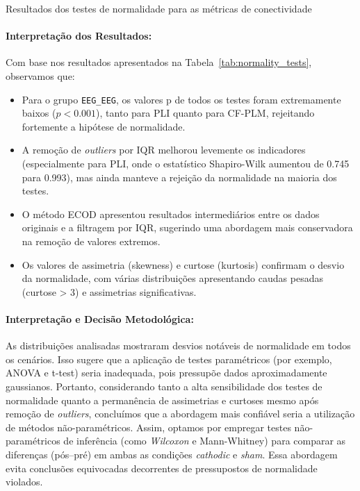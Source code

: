 \begin{table}[htbp]
    \caption{Resultados dos testes de normalidade para as métricas de conectividade}
    \label{tab:normality_tests}
    \begin{adjustbox}{width=\textwidth, center}
      
    \end{adjustbox}
  \end{table}
  

\paragraph{Interpretação dos Resultados:}
Com base nos resultados apresentados na Tabela~\ref{tab:normality_tests}, observamos que:

\begin{itemize}
    \item Para o grupo \texttt{EEG\_EEG}, os valores p de todos os testes foram extremamente baixos ($p < 0.001$), tanto para PLI quanto para CF-PLM, rejeitando fortemente a hipótese de normalidade.
    
    \item A remoção de \textit{outliers} por IQR melhorou levemente os indicadores (especialmente para PLI, onde o estatístico Shapiro-Wilk aumentou de 0.745 para 0.993), mas ainda manteve a rejeição da normalidade na maioria dos testes.
    
    \item O método ECOD apresentou resultados intermediários entre os dados originais e a filtragem por IQR, sugerindo uma abordagem mais conservadora na remoção de valores extremos.
    
    \item Os valores de assimetria (skewness) e curtose (kurtosis) confirmam o desvio da normalidade, com várias distribuições apresentando caudas pesadas (curtose > 3) e assimetrias significativas.
\end{itemize}

\paragraph{Interpretação e Decisão Metodológica:}
As distribuições analisadas mostraram desvios notáveis de normalidade em todos os cenários. Isso sugere que a aplicação de testes paramétricos (por exemplo, ANOVA e t-test) seria inadequada, pois pressupõe dados aproximadamente gaussianos. 
Portanto, considerando tanto a alta sensibilidade dos testes de normalidade quanto a permanência de assimetrias e curtoses mesmo após remoção de \textit{outliers}, concluímos que a abordagem mais confiável seria a utilização de métodos não-paramétricos.
Assim, optamos por empregar testes não-paramétricos de inferência (como \textit{Wilcoxon} e Mann-Whitney) para comparar as diferenças (pós--pré) em ambas as condições \textit{cathodic} e \textit{sham}. Essa abordagem evita conclusões equivocadas decorrentes de pressupostos de normalidade violados.
